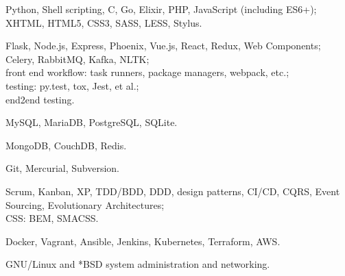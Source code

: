 \documentclass{resume}
\begin{document}
\begin{skillssection}
        {Python, Shell scripting, C, Go, Elixir, PHP, JavaScript (including
            ES6+);\\%
            XHTML, HTML5, CSS3, SASS, LESS, Stylus.}

        {Flask, Node.js, Express, Phoenix, Vue.js, React, Redux, Web
            Components; Celery, RabbitMQ, Kafka, NLTK;\\%
            front end workflow: task runners, package managers, webpack,
            etc.;\\%
            testing: py.test, tox, Jest, et al.;\\%
            end2end testing.}

        {MySQL, MariaDB, PostgreSQL, SQLite.}

        {MongoDB, CouchDB, Redis.}

        {Git, Mercurial, Subversion.}

        {Scrum, Kanban, XP, TDD/BDD, DDD, design patterns, CI/CD, CQRS, Event
            Sourcing, Evolutionary Architectures;\\%
            CSS: BEM, SMACSS.}

        {Docker, Vagrant, Ansible, Jenkins, Kubernetes, Terraform, AWS.}

        {GNU/Linux and *BSD system administration and networking.}
\end{skillssection}

\end{document}
